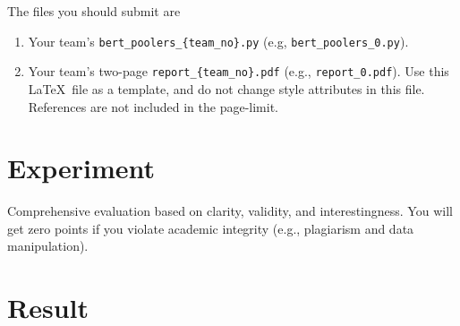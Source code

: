 \documentclass[UTF8]{article}
\begin{document}
The files you should submit are
\begin{enumerate}
  \item Your team's \texttt{bert\_poolers\_\{team\_no\}.py} (e.g, \texttt{bert\_poolers\_0.py}).
  \item Your team's two-page \texttt{report\_\{team\_no\}.pdf} (e.g., \texttt{report\_0.pdf}). Use this \LaTeX\ file as a template, and do not change style attributes in this file. References are not included in the page-limit.
\end{enumerate}


\section{Experiment}

Comprehensive evaluation based on clarity, validity, and interestingness. You will get zero points if you violate academic integrity (e.g., plagiarism and data manipulation).

\section{Result}




\end{document}
